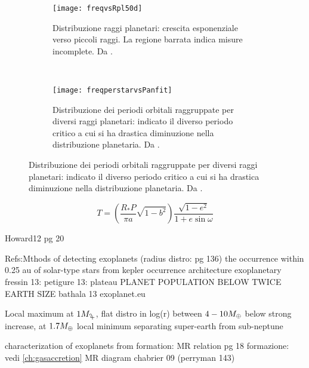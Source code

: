 \begin{figure}[!ht]
	\begin{subfigure}[b]{0.47\textwidth}
		\centering
		\texttt{[image: freqvsRpl50d]}
		\caption{Distribuzione raggi planetari: crescita esponenziale verso piccoli raggi. La regione barrata indica misure incomplete. Da \cite{howard2012planet}.}\label{fig:howard2012planet}
	\end{subfigure}
	~
	\begin{subfigure}[b]{0.5\textwidth} \centering
		\texttt{[image: freqperstarvsPanfit]}
		\caption{Distribuzione dei periodi orbitali raggruppate per diversi raggi planetari: indicato il diverso periodo critico a cui si ha drastica diminuzione nella distribuzione planetaria. Da \cite{howard2012planet}.}\label{fig:freqperstarvsPanfit}
	\end{subfigure}
\end{figure}

\begin{workout}
\[T=(\frac{R_*P}{\pi a}\sqrt{1-b^2})\frac{\sqrt{1-e^2}}{1+e\sin{\omega}}\]
\end{workout}

\begin{workout}
Howard12 pg 20
\end{workout}

\begin{workout}
Refs:Mthods of detecting exoplanets (radius distro: pg 136)
the occurrence within 0.25 au of solar-type stars from kepler
occurrence architecture exoplanetary
fressin 13: 
petigure 13: plateau PLANET POPULATION BELOW TWICE EARTH SIZE
bathala 13
exoplanet.eu
\end{workout}

\begin{workout}
Local maximum at $1\mjupiter{}$, flat distro in log(r) between $4-10M_{\oplus}{}$ below strong increase, at $1.7M_{\oplus}{}$ local minimum separating super-earth from sub-neptune
\end{workout}

\begin{workout}
characterization of exoplanets from formation: MR relation pg 18
formazione: vedi \ref{ch:gasaccretion}
MR diagram chabrier 09 (perryman 143)
\end{workout}

